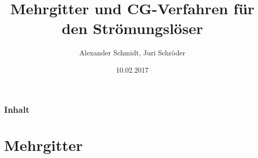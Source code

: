 \documentclass{beamer}
\title[Mehrgitter und CG]{Mehrgitter und CG-Verfahren für den Strömungslöser} %
\author{Alexander Schmidt, Juri Schröder} %
\institute[Universität Stuttgart --- IPVS] %
{
Universität Stuttgart \\ %
\medskip
}
\date{10.02.2017} %
\begin{document}



\begin{frame}
\titlepage %
\end{frame}

\begin{frame}
\frametitle{Inhalt} %
\tableofcontents %
\end{frame}

\section{Mehrgitter}



\end{document}
